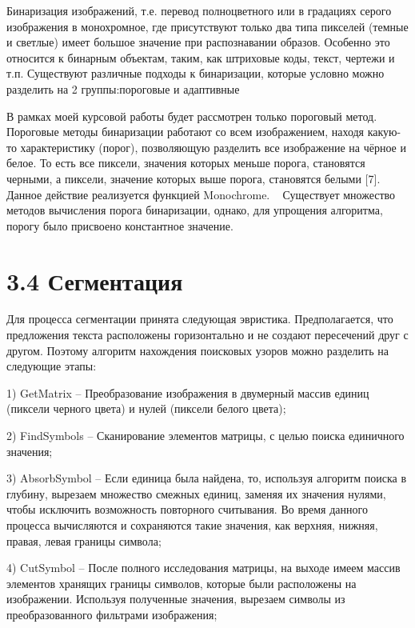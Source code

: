 \documentclass[14pt,a4paper]{extreport}
\begin{document}
\hspace{4ex} Бинаризация изображений, т.е. перевод полноцветного или в градациях серого изображения в монохромное, где присутствуют только два типа пикселей (темные и светлые) имеет большое значение при распознавании образов. Особенно это относится к бинарным объектам, таким, как штриховые коды, текст, чертежи и т.п. Существуют различные подходы к бинаризации, которые условно можно разделить на 2 группы:пороговые и адаптивные\

  \hspace {4ex}  В рамках моей курсовой работы будет рассмотрен только пороговый метод.
Пороговые методы бинаризации работают со всем изображением, находя какую-то характеристику (порог), позволяющую разделить все изображение на чёрное и белое. То есть все пиксели, значения которых меньше порога, становятся черными, а пиксели, значение которых выше порога, становятся белыми [7]. Данное действие реализуется функцией Monochrome.
\
  \hspace {4ex}  Существует множество методов вычисления порога бинаризации, однако, для упрощения алгоритма, порогу было присвоено константное значение.\

                  \section*{\normalsize\hspace{4ex}3.4 Сегментация}
  \hspace {4ex} Для процесса сегментации принята следующая эвристика. Предполагается, что предложения текста расположены горизонтально и не создают пересечений друг с другом. Поэтому алгоритм нахождения поисковых узоров можно разделить на следующие этапы:\
  
  \hspace {4ex} 1) GetMatrix – Преобразование изображения в двумерный массив единиц (пиксели черного цвета) и нулей (пиксели белого цвета);\
  
  \hspace {4ex} 2) FindSymbols  – Сканирование элементов матрицы, с целью поиска единичного значения;\
  
  \hspace {4ex} 3) AbsorbSymbol – Если единица была найдена, то, используя алгоритм поиска в глубину, вырезаем множество смежных единиц, заменяя их значения нулями, чтобы исключить возможность повторного считывания. Во время данного процесса вычисляются и сохраняются такие значения, как верхняя, нижняя, правая, левая границы символа;\
  
  \hspace {4ex} 4) CutSymbol – После полного исследования матрицы, на выходе имеем массив элементов хранящих границы символов, которые были расположены на изображении. Используя полученные значения, вырезаем символы из преобразованного фильтрами изображения;\
  
\end{document}
